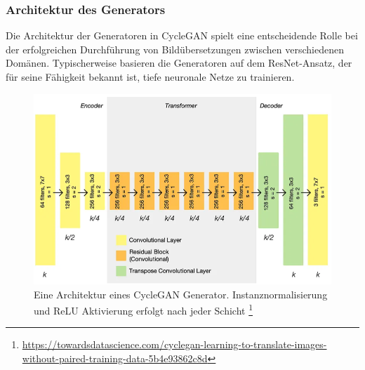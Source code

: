 \subsubsection{Architektur des Generators}
Die Architektur der Generatoren in CycleGAN spielt eine entscheidende Rolle bei der erfolgreichen Durchführung von Bildübersetzungen zwischen verschiedenen Domänen. Typischerweise basieren die Generatoren auf dem ResNet-Ansatz, der für seine Fähigkeit bekannt ist, tiefe neuronale Netze zu trainieren\cite{He.2015}.
\\

\begin{figure}[ht]
	\centering
	\includegraphics[width=0.8\linewidth]{./images/cycleGanGeneratorArchitecture.png}
	\caption{Eine Architektur eines CycleGAN Generator. Instanznormalisierung und ReLU Aktivierung erfolgt nach jeder Schicht
	\protect\footnote{\url{https://towardsdatascience.com/cyclegan-learning-to-translate-images-without-paired-training-data-5b4e93862c8d}}}
	\label{fig:cycleGanGeneratorArchitecture}
\end{figure}

